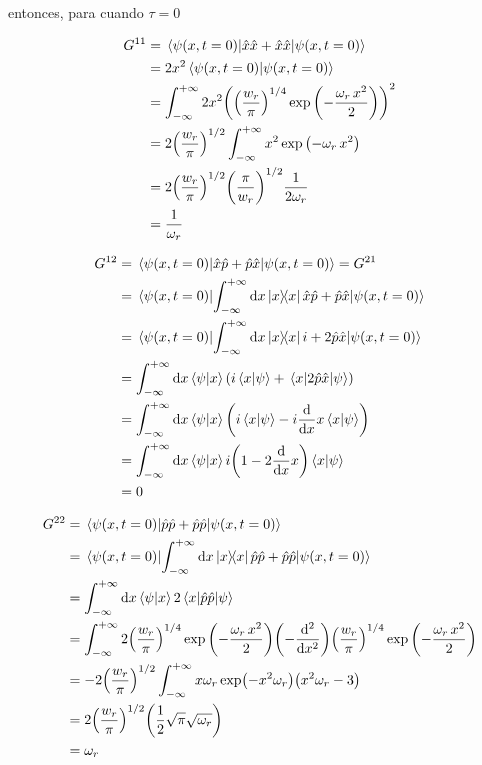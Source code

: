 \documentclass[../Main.tex]{subfiles}
\begin{document}
entonces, para cuando $\tau=0$

\begin{equation}
\begin{split}
G^{11} & =\ev{\hat{x}\hat{x}+\hat{x}\hat{x}}{\psi(x,t=0)} \\
 & =2x^2\ip{\psi(x,t=0)} \\
 & =\int_{-\infty}^{+\infty}2x^2\pqty{\pqty{\frac{w_r}{\pi}}^{1/4}\exp \pqty{- \frac{\omega_{r} \, x^2}{2}}}^2 \\
 & =2\pqty{\frac{w_r}{\pi}}^{1/2}\int_{-\infty}^{+\infty}x^2\exp \pqty{-\omega_{r} \, x^2} \\
 & =2\pqty{\frac{w_r}{\pi}}^{1/2}\pqty{\frac{\pi}{w_r}}^{1/2}\dfrac{1}{2\omega_r} \\
 & =\dfrac{1}{\omega_r}
\end{split}
\end{equation}

\begin{equation}
\begin{split}
G^{12} & =\ev{\hat{x}\hat{p}+\hat{p}\hat{x}}{\psi(x,t=0)} =G^{21} \\
& =\ev{\int_{-\infty}^{+\infty}\dd{x}\op{x}{x}\hat{x}\hat{p}+\hat{p}\hat{x}}{\psi(x,t=0)} \\
& =\ev{\int_{-\infty}^{+\infty}\dd{x}\op{x}{x}i+2\hat{p}\hat{x}}{\psi(x,t=0)} \\
& =\int_{-\infty}^{+\infty}\dd{x}\ip{\psi}{x}\qty(i\ip{x}{\psi}+\mel{x}{2\hat{p}\hat{x}}{\psi}) \\
& =\int_{-\infty}^{+\infty}\dd{x}\ip{\psi}{x}\qty(i\ip{x}{\psi}-i\dv{x}x\ip{x}{\psi}) \\
& =\int_{-\infty}^{+\infty}\dd{x}\ip{\psi}{x}i\qty(1-2\dv{x}x)\ip{x}{\psi} \\
& =0 \\
\end{split}
\end{equation}

\begin{equation}
\begin{split}
G^{22} & =\ev{\hat{p}\hat{p}+\hat{p}\hat{p}}{\psi(x,t=0)} \\
& =\ev{\int_{-\infty}^{+\infty}\dd{x}\op{x}{x}\hat{p}\hat{p}+\hat{p}\hat{p}}{\psi(x,t=0)} \\
& =\int_{-\infty}^{+\infty}\dd{x}\ip{\psi}{x}2\mel{x}{\hat{p}\hat{p}}{\psi} \\
& =\int_{-\infty}^{+\infty}2\pqty{\frac{w_r}{\pi}}^{1/4}\exp \pqty{- \frac{\omega_{r} \, x^2}{2}}\pqty{-\dv[2]{x}}\pqty{\frac{w_r}{\pi}}^{1/4}\exp \pqty{- \frac{\omega_{r} \, x^2}{2}} \\
& =-2\pqty{\frac{w_r}{\pi}}^{1/2}\int_{-\infty}^{+\infty}x \omega_r  \exp(-x^2 \omega_r ) \qty(x^2 \omega_r -3) \\
& =2\pqty{\frac{w_r}{\pi}}^{1/2}\pqty{\frac{1}{2} \sqrt{\pi } \sqrt{\omega_r }} \\
& =\omega_r
\end{split}
\end{equation}
\end{document}
